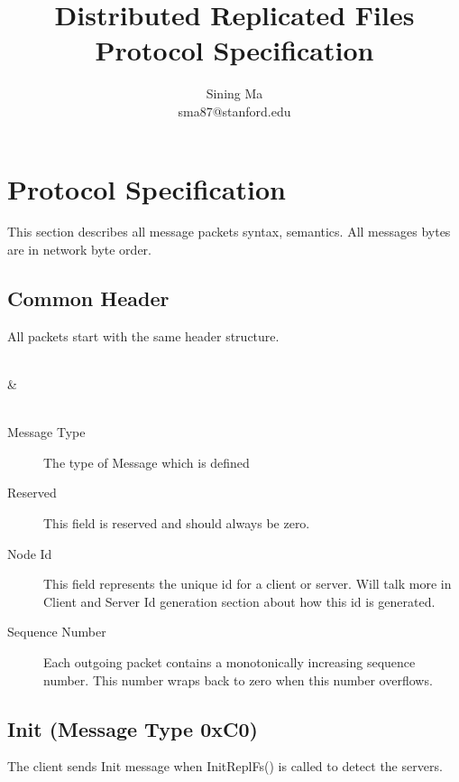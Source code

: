 \documentclass[12pt,fleqn]{article}
\begin{document}
\title{Distributed Replicated Files Protocol Specification}
\author{Sining Ma \\ sma87@stanford.edu}

\maketitle

\section{Protocol Specification}
This section describes all message packets syntax, semantics. All messages bytes are in network byte order. 

\subsection{Common Header}
All packets start with the same header structure.

\begin{center}
	\begin{bytefield}[bitwidth=1.1em]{16}
		 \\
		 &  \\
		 \\
	\end{bytefield}
\end{center}

\begin{description}
	\item[Message Type] The type of Message which is defined 
	\item[Reserved] This field is reserved and should always be zero.
	\item[Node Id] This field represents the unique id for a client or server. Will talk more in Client and Server Id generation section about how this id is generated.
	\item[Sequence Number] Each outgoing packet contains a monotonically increasing sequence number. This number wraps back to zero when this number overflows.
\end{description}

\subsection{Init (Message Type 0xC0)}
The client sends Init message when InitReplFs() is called to detect the servers.
\end{document}

